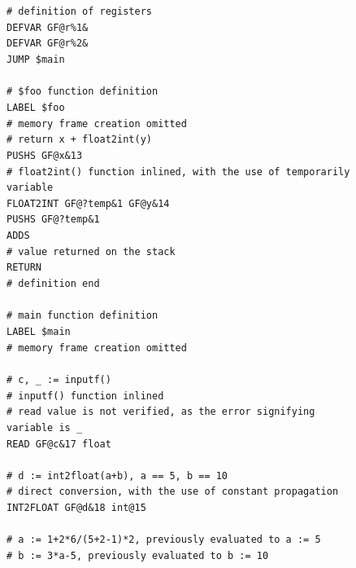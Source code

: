 \documentclass[12pt]{article}
\begin{document}
\begin{figure}
\texttt{\textcolor{comment}{\# definition of registers}\\
DEFVAR GF@r\%1\&\\
DEFVAR GF@r\%2\&\\
JUMP \$main\\
\\
\textcolor{comment}{\# \$foo function definition}\\
LABEL \$foo\\
\textcolor{comment}{\# memory frame creation omitted}\\
\textcolor{comment}{\# return x + float2int(y)}\\
PUSHS GF@x\&13\\
\textcolor{comment}{\# float2int() function inlined, with the use of temporarily variable}\\
FLOAT2INT GF@?temp\&1 GF@y\&14\\
PUSHS GF@?temp\&1\\
ADDS\\
\textcolor{comment}{\# value returned on the stack}\\
RETURN\\
\textcolor{comment}{\# definition end}\\
\\
\textcolor{comment}{\# main function definition}\\
LABEL \$main\\
\textcolor{comment}{\# memory frame creation omitted}\\
\\
\textcolor{comment}{\# c, \_ := inputf()}\\
\textcolor{comment}{\# inputf() function inlined}\\
\textcolor{comment}{\# read value is not verified, as the error signifying variable is \_}\\
READ GF@c\&17 float\\
\\
\textcolor{comment}{\# d := int2float(a+b), a == 5, b == 10}\\
\textcolor{comment}{\# direct conversion, with the use of constant propagation}\\
INT2FLOAT GF@d\&18 int@15\\
\\
\textcolor{comment}{\# a := 1+2\**6/(5+2-1)\**2, previously evaluated to a := 5}\\
\textcolor{comment}{\# b := 3\**a-5, previously evaluated to b := 10}\\
}
\end{figure}
\end{document}
